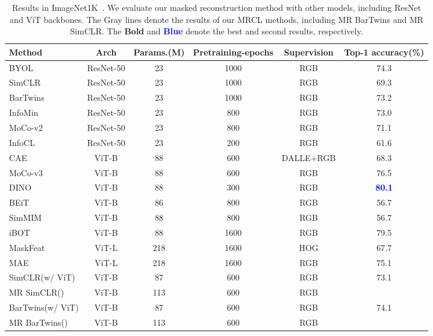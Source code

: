 \documentclass[10pt,twocolumn,letterpaper]{article}
\begin{document}
\begin{table*}[th!]
    \centering
    \small
    \begin{tabular}[width=\textwidth]{l|ccccc}
    \toprule
        Method & Arch &Params.(M) & Pretraining-epochs & Supervision& Top-1 accuracy(\%)   \\
        \midrule
         BYOL\cite{grill2020bootstrap} & ResNet-50 & 23&1000 &RGB&74.3\\
         SimCLR\cite{chen2020simple} & ResNet-50 &23 & 1000&RGB&69.3\\
         BarTwins\cite{zbontar2021barlow} & ResNet-50&23&1000 &RGB&73.2\\
         InfoMin\cite{tian2020makes} & ResNet-50 & 23& 800 &RGB&73.0\\
         MoCo-v2\cite{chen2020improved} & ResNet-50&23&800&RGB&71.1\\
         InfoCL\cite{wang2022rethinking}& ResNet-50&23&200&RGB&61.6\\
         \midrule
         CAE\cite{chen2022context} & ViT-B & 88 & 600 & DALLE+RGB & 68.3\\
         MoCo-v3\cite{chen2021empirical} & ViT-B&88&600&RGB&76.5\\
         DINO\cite{caron2021emerging} & ViT-B & 88 & 300 & RGB & \textbf{\textcolor{blue}{80.1}}  \\
         BEiT\cite{bao2021beit} & ViT-B & 86 & 800  & RGB & 56.7  \\
         SimMIM\cite{xie2022simmim} & ViT-B & 88 & 800 & RGB & 56.7    \\
         iBOT\cite{zhou2021ibot}& ViT-B & 88 & 1600 & RGB & 79.5\\
         MaskFeat\cite{wei2022masked} & ViT-L & 218 & 1600 &HOG& 67.7\\
         MAE\cite{he2022masked} & ViT-L & 218 & 1600 & RGB & 75.1\\
         \midrule[1pt]
         SimCLR(w/ ViT) & ViT-B & 87 & 600 &RGB& 73.1 \\
         \rowcolor{gray!20} MR SimCLR() & ViT-B & 113 & 600 &RGB&  \\
         \midrule
         BarTwins(w/ ViT) & ViT-B & 87 & 600 &RGB& 74.1\\
         \rowcolor{gray!20} MR BarTwins() & ViT-B & 113 & 600 &RGB& \\
         \bottomrule
    \end{tabular}
    \caption{Results in ImageNet1K~\cite{deng2009imagenet}. We evaluate our masked reconstruction method with other models, including ResNet and ViT backbones. The \colorbox{gray!20}{Gray} lines denote the results of our MRCL methods, including MR BarTwins and MR SimCLR. The \textbf{Bold} and \textbf{\textcolor{blue}{Blue}} denote the best and second results, respectively.}
    \label{table:Imagenet}
\end{table*}
\end{document}

